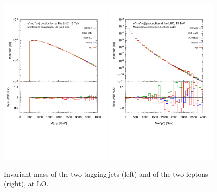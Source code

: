 \documentclass[a4paper,10pt]{report}
\begin{document}
\begin{figure}[h!]
   \centering
   \includegraphics[width=0.49\textwidth,angle=0,clip=true,trim={0.4cm 4.cm 0.6cm 1.5cm}]{figures/mjj_LO.pdf}
   \includegraphics[width=0.49\textwidth,angle=0,clip=true,trim={0.4cm 4.cm 0.6cm 1.5cm}]{figures/mll_LO.pdf}
\caption{\label{fig:mjj-llLO}Invariant-mass of the two tagging jets (left) and of the two leptons (right), at LO.
}
\end{figure}
%
\end{document}
